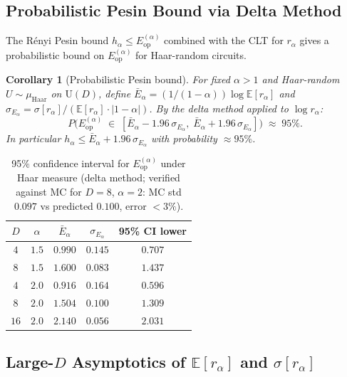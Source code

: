 \documentclass[12pt,a4paper]{article}
\newtheorem{corollary}[theorem]{Corollary}
\begin{document}
\subsection{Probabilistic Pesin Bound via Delta Method}
\label{subsec:prob_pesin}

The Rényi Pesin bound $h_\alpha\leq E_\mathrm{op}^{(\alpha)}$ combined with the
CLT for $r_\alpha$ gives a probabilistic bound on $E_\mathrm{op}^{(\alpha)}$
for Haar-random circuits.

\begin{corollary}[Probabilistic Pesin bound]\label{cor:prob_pesin}
For fixed $\alpha>1$ and Haar-random $U\sim\mu_\mathrm{Haar}$ on $\mathrm{U}(D)$,
define $\bar{E}_\alpha = (1/(1-\alpha))\log\mathbb{E}[r_\alpha]$ and
$\sigma_{E_\alpha} = \sigma[r_\alpha]/(\mathbb{E}[r_\alpha]\cdot|1-\alpha|)$.
By the delta method applied to $\log r_\alpha$:
\[
  P\!\bigl(E_\mathrm{op}^{(\alpha)}\;\in\;[\bar{E}_\alpha - 1.96\,\sigma_{E_\alpha},\;
                                            \bar{E}_\alpha + 1.96\,\sigma_{E_\alpha}]\bigr)
  \;\approx\;95\%.
\]
In particular $h_\alpha\leq\bar{E}_\alpha + 1.96\,\sigma_{E_\alpha}$ with probability $\approx95\%$.
\end{corollary}

\begin{table}[h]
\centering
\caption{95\% confidence interval for $E_\mathrm{op}^{(\alpha)}$ under Haar measure
(delta method; verified against MC for $D=8$, $\alpha=2$: MC std $0.097$ vs predicted $0.100$, error $<3\%$).}
\label{tab:prob_pesin}
\begin{tabular}{cc|ccc}
\hline
$D$ & $\alpha$ & $\bar{E}_\alpha$ & $\sigma_{E_\alpha}$ & 95\% CI lower \\
\hline
$4$  & $1.5$ & $0.990$ & $0.145$ & $0.707$ \\
$8$  & $1.5$ & $1.600$ & $0.083$ & $1.437$ \\
$4$  & $2.0$ & $0.916$ & $0.164$ & $0.596$ \\
$8$  & $2.0$ & $1.504$ & $0.100$ & $1.309$ \\
$16$ & $2.0$ & $2.140$ & $0.056$ & $2.031$ \\
\hline
\end{tabular}
\end{table}

\subsection{Large-$D$ Asymptotics of $\mathbb{E}[r_\alpha]$ and $\sigma[r_\alpha]$}
\label{subsec:ld_asymptotics}
\end{document}
